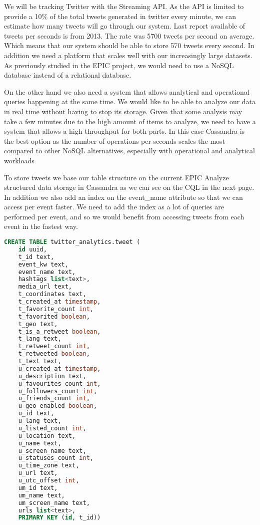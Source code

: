 We will be tracking Twitter with the Streaming API. As the API is limited to provide a 10\% of the total tweets generated in twitter every minute, we can estimate how many tweets will go through our system. Last report available of tweets per seconds is from 2013. The rate was 5700 tweets\parencite{Reference1} per second on average.  Which means that our system should be able to store 570 tweets every second. In addition we need a platform that scales well with our increasingly large datasets. As previously studied in the EPIC project, we would need to use a NoSQL database instead of a relational database.
 
On the other hand we also need a system that allows analytical and operational queries happening at the same time. We would like to be able to analyze our data in real time without having to stop its storage. Given that some analysis may take a few minutes due to the high amount of items to analyze, we need to  have a system that allows a high throughput for both parts. In this case Cassandra is the best option as the number of operations per seconds scales the most compared to other NoSQL alternatives, especially with operational and analytical workloads 
 
To store tweets we base our table structure on the current EPIC Analyze structured data storage in Cassandra as we can see on the CQL in the next page. In addition we also add an index on the event\_name attribute so that we can access per event faster. We need to add the index as a lot of queries are performed per event, and so we would benefit from accessing tweets from each event in the fastest way.
\newpage
\begin{lstlisting}[language=SQL, caption=Tweets CQL table]
CREATE TABLE twitter_analytics.tweet (
    id uuid,
    t_id text,
    event_kw text,
    event_name text,
    hashtags list<text>,
    media_url text,
    t_coordinates text,
    t_created_at timestamp,
    t_favorite_count int,
    t_favorited boolean,
    t_geo text,
    t_is_a_retweet boolean,
    t_lang text,
    t_retweet_count int,
    t_retweeted boolean,
    t_text text,
    u_created_at timestamp,
    u_description text,
    u_favourites_count int,
    u_followers_count int,
    u_friends_count int,
    u_geo_enabled boolean,
    u_id text,
    u_lang text,
    u_listed_count int,
    u_location text,
    u_name text,
    u_screen_name text,
    u_statuses_count int,
    u_time_zone text,
    u_url text,
    u_utc_offset int,
    um_id text,
    um_name text,
    um_screen_name text,
    urls list<text>,
    PRIMARY KEY (id, t_id))
\end{lstlisting}

